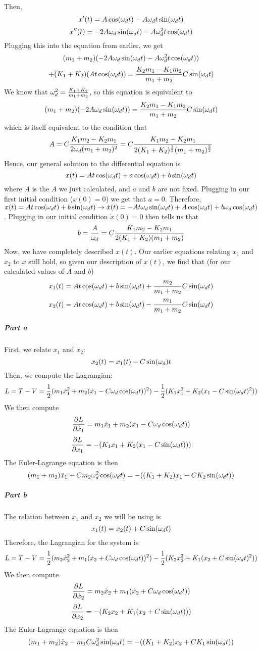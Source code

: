 Then, 
$$x'(t)= A\cos(\omega_d t)-A\omega_d t\sin(\omega_d t)$$
$$x''(t)=-2A\omega_d \sin(\omega_d t)-A\omega_d^2 t \cos(\omega_d t)$$
Plugging this into the equation from earlier, we get
$$(m_1+m_2)(-2A\omega_d \sin(\omega_d t)-A\omega_d^2 t \cos(\omega_d t))$$
$$+(K_1+K_2)( A t \cos(\omega_d t))=\frac{K_2 m_1-K_1 m_2}{m_1+m_2} C \sin(\omega_d t)$$
We know that $\omega_d^2 = \frac{K_1+K_2}{m_1+m_2}$, so this equation is equivalent to
$$(m_1+m_2)(-2A\omega_d \sin(\omega_d t))=\frac{K_2 m_1-K_1 m_2}{m_1+m_2} C \sin(\omega_d t)$$
which is itself equivalent to the condition that
$$A=C\frac{K_1 m_2-K_2 m_1}{2\omega_d(m_1+m_2)^2}=C\frac{K_1 m_2-K_2 m_1}{2(K_1+K_2)^{\frac 1 2}(m_1+m_2)^{\frac 3 2}}$$
Hence, our general solution to the differential equation is
$$x(t)=A t\cos(\omega_d t)+a \cos(\omega_d t)+b\sin(\omega_d t)$$
where $A$ is the $A$ we just calculated, and $a$ and $b$ are not fixed.  Plugging in our first initial condition ($x(0)=0$) we get that $a=0$.  Therefore, $x(t)=At\cos(\omega_d t)+b\sin(\omega_d t)\rightarrow \dot x(t)=-At \omega_d \sin(\omega_d t)+ A\cos(\omega_d t)+b\omega_d\cos(\omega_d t)$.  Plugging in our initial condition $\dot x(0)=0$ then tells us that
$$b=\frac{A}{\omega_d}=C\frac{K_1 m_2-K_2 m_1}{2(K_1+K_2)(m_1+m_2)}$$
Now, we have completely described $x(t)$.  Our earlier equations relating $x_1$ and $x_2$ to $x$ still hold, so given our description of $x(t)$, we find that (for our calculated values of $A$ and $b$)
$$x_1(t)=At \cos(\omega_d t)+b\sin(\omega_d t)+\frac{m_2}{m_1+m_2} C\sin(\omega_d t)$$
$$x_2(t)=At\cos(\omega_d t)+b\sin(\omega_d t)-\frac{m_1}{m_1+m_2}C\sin(\omega_d t)$$
\subparagraph{Part a}  First, we relate $x_1$ and $x_2$:
$$x_2(t)= x_1(t)-C\sin(\omega_d) t$$
Then, we compute the Lagrangian:
$$L=T-V= \frac 1 2 (m_1 \dot x_1^2 + m_2 (\dot x_1 - C\omega_d \cos(\omega_d t))^2)-\frac 1 2 (K_1 x_1^2+K_2 (x_1-C \sin(\omega_d t)^2))$$
We then compute
$$\frac{\partial L}{\partial \dot x_1}= m_1 \dot x_1 + m_2 (\dot x_1 - C \omega_d \cos(\omega_d t))$$
$$\frac{\partial L}{\partial x_1}=-(K_1 x_1+K_2(x_1-C\sin (\omega_d t)))$$
The Euler-Lagrange equation is then 
$$  (m_1+m_2)\ddot x_1 + C m_2 \omega_d^2 \cos(\omega_d t)=-((K_1+K_2) x_1 - C K_2 \sin(\omega_d t))$$
\subparagraph{Part b}  The relation between $x_1$ and $x_2$ we will be using is
$$x_1(t)=x_2(t) + C\sin(\omega_d t)$$
Therefore, the Lagrangian for the system is 
$$L=T-V= \frac 1 2 (m_2 \dot x_2^2 + m_1 (\dot x_2 + C\omega_d \cos(\omega_d t))^2)-\frac 1 2 (K_2 x_2^2+K_1 (x_2+C \sin(\omega_d t)^2))$$
We then compute
$$\frac{\partial L}{\partial \dot x_2}= m_2 \dot x_2 + m_1 (\dot x_2+ C \omega_d \cos(\omega_d t))$$
$$\frac{\partial L}{\partial x_2}=-(K_2 x_2+K_1(x_2+C\sin (\omega_d t)))$$
The Euler-Lagrange equation is then
$$ (m_1+m_2) \ddot x_2-m_1 C \omega_d^2 \sin(\omega_d t)=-((K_1+K_2) x_2+C K_1 \sin(\omega_d t))$$

